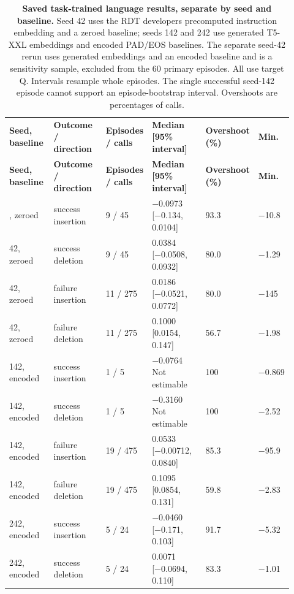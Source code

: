 \setlength{\tabcolsep}{2pt}
\begin{longtable}{p{0.170\linewidth} p{0.220\linewidth} p{0.120\linewidth} p{0.230\linewidth} p{0.110\linewidth} p{0.070\linewidth}}
\noalign{\addtocounter{table}{-1}}
\caption*{\textbf{Saved task-trained language results, separate by seed and baseline.} Seed 42 uses the RDT developers\textquotesingle{} precomputed instruction embedding and a zeroed baseline; seeds 142 and 242 use generated T5-XXL embeddings and encoded PAD/EOS baselines. The separate seed-42 rerun uses generated embeddings and an encoded baseline and is a sensitivity sample, excluded from the 60 primary episodes. All use target Q. Intervals resample whole episodes. The single successful seed-142 episode cannot support an episode-bootstrap interval. Overshoots are percentages of calls.}\\
\toprule
\textbf{Seed, baseline} & \textbf{Outcome / direction} & \textbf{Episodes / calls} & \textbf{Median [95\% interval]} & \textbf{Overshoot (\%)} & \textbf{Min.} \\
\midrule\endfirsthead
\toprule
\textbf{Seed, baseline} & \textbf{Outcome / direction} & \textbf{Episodes / calls} & \textbf{Median [95\% interval]} & \textbf{Overshoot (\%)} & \textbf{Min.} \\
\midrule\endhead
\bottomrule\endfoot
42, zeroed & success insertion & 9 / 45 & −0.0973 [−0.134, 0.0104] & 93.3 & −10.8 \\
42, zeroed & success deletion & 9 / 45 & 0.0384 [−0.0508, 0.0932] & 80.0 & −1.29 \\
42, zeroed & failure insertion & 11 / 275 & 0.0186 [−0.0521, 0.0772] & 80.0 & −145 \\
42, zeroed & failure deletion & 11 / 275 & 0.1000 [0.0154, 0.147] & 56.7 & −1.98 \\
142, encoded & success insertion & 1 / 5 & −0.0764 Not estimable & 100 & −0.869 \\
142, encoded & success deletion & 1 / 5 & −0.3160 Not estimable & 100 & −2.52 \\
142, encoded & failure insertion & 19 / 475 & 0.0533 [−0.00712, 0.0840] & 85.3 & −95.9 \\
142, encoded & failure deletion & 19 / 475 & 0.1095 [0.0854, 0.131] & 59.8 & −2.83 \\
242, encoded & success insertion & 5 / 24 & −0.0460 [−0.171, 0.103] & 91.7 & −5.32 \\
242, encoded & success deletion & 5 / 24 & 0.0071 [−0.0694, 0.110] & 83.3 & −1.01 \\

\end{longtable}

